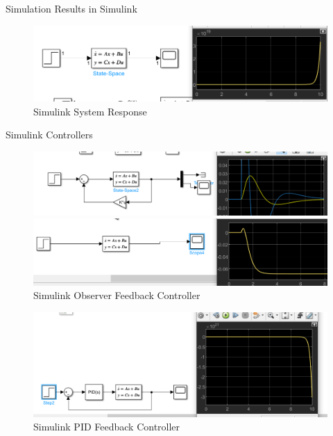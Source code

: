 \documentclass[10pt,compress,mathserif]{beamer}
\begin{document}
\begin{frame}{Simulation Results in Simulink}
\begin{figure}[h!]
    \centering
    \includegraphics[scale=0.5]{simulink_system_response.png}
    \caption{Simulink System Response}
\end{figure}
\end{frame}

\begin{frame}{Simulink Controllers}
\begin{figure}[h!]
    \centering
    \begin{minipage}{0.6\textwidth}
        \centering
        \includegraphics[width=\textwidth]{sl_sfc.png}
        \caption{Simulink State Feedback Controller}
    \end{minipage}
    \hfill
    \begin{minipage}{0.6\textwidth}
        \centering
        \includegraphics[width=\textwidth]{sl_obs.png}
        \caption{Simulink Observer Feedback Controller}
    \end{minipage}
\end{figure}
\begin{figure}[h!]
    \centering
    \includegraphics[scale=0.4]{sl_PID.png}
    \caption{Simulink PID Feedback Controller}
\end{figure}
\end{frame}
\end{document}

